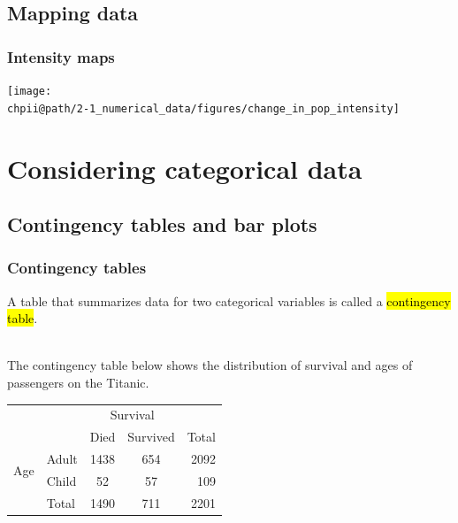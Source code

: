 \documentclass[slidestop,compress,mathserif]{beamer}
\makeatletter
\def\chpii@path{../../Chp 2}
\makeatother
\begin{document}

\subsection{Mapping data}


\begin{frame}
\frametitle{Intensity maps}


\begin{center}
\texttt{[image: \\chpii@path/2-1\_numerical\_data/figures/change\_in\_pop\_intensity]}
\end{center}


\end{frame}




\section{Considering categorical data}


\subsection{Contingency tables and bar plots}


\begin{frame}
\frametitle{Contingency tables}

A table that summarizes data for two categorical variables is called a \hl{contingency table}.

$\:$ \\
\pause
The contingency table below shows the distribution of survival and ages of passengers on the Titanic.

\begin{center}
\begin{tabular}{l l cc r}
					               & 			 & \multicolumn{2}{c}{{Survival}} \\
  \cline{3-4}
					               &			 & Died	 & Survived	& Total \\ 
  \cline{2-5}
\multirow{2}{*}{{Age}}& Adult & 1438  & 654 	  	& 2092 \\ 
  					             & Child & 52 	 & 57	 	    & 109\\ 
  \cline{2-5}
  					             & Total & 1490  & 711	    &  2201 \\
  \cline{2-5}
\end{tabular}
\end{center}
\end{frame}
\end{document}
